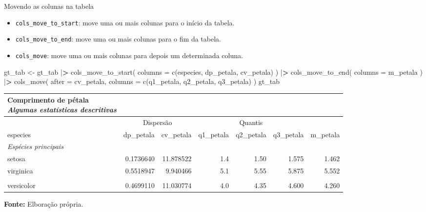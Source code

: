 \documentclass[
  10pt,
  ignorenonframetext,
]{beamer}
\newenvironment{Shaded}{}{}
\newcommand{\DataTypeTok}[1]{#1}
\newcommand{\ErrorTok}[1]{\textcolor[rgb]{1.00,0.00,0.00}{\textbf{#1}}}
\newcommand{\KeywordTok}[1]{\textcolor[rgb]{0.00,0.00,1.00}{#1}}
\newcommand{\NormalTok}[1]{#1}
\newcommand{\OperatorTok}[1]{#1}
\newcommand{\StringTok}[1]{\textcolor[rgb]{0.00,0.50,0.50}{#1}}
\providecommand{\tightlist}{%
  \setlength{\itemsep}{0pt}\setlength{\parskip}{0pt}}
\begin{document}
\begin{frame}[fragile]{Movendo as colunas na tabela}
\protect\hypertarget{movendo-as-colunas-na-tabela}{}
\begin{itemize}
\tightlist
\item
  \texttt{cols\_move\_to\_start}: move uma ou mais colunas para o início
  da tabela.
\item
  \texttt{cols\_move\_to\_end}: move uma ou mais colunas para o fim da
  tabela.
\item
  \texttt{cols\_move}: move uma ou mais colunas para depois um
  determinada coluna.
\end{itemize}

\begin{Shaded}
\begin{Highlighting}[]
\NormalTok{gt\_tab \textless{}{-}}\StringTok{ }\NormalTok{gt\_tab }\OperatorTok{|}\ErrorTok{\textgreater{}}
\StringTok{  }\KeywordTok{cols\_move\_to\_start}\NormalTok{(}
    \DataTypeTok{columns =} \KeywordTok{c}\NormalTok{(especies, dp\_petala, cv\_petala)}
\NormalTok{  ) }\OperatorTok{|}\ErrorTok{\textgreater{}}
\StringTok{  }\KeywordTok{cols\_move\_to\_end}\NormalTok{(}
    \DataTypeTok{columns =}\NormalTok{ m\_petala}
\NormalTok{  ) }\OperatorTok{|}\ErrorTok{\textgreater{}}
\StringTok{  }\KeywordTok{cols\_move}\NormalTok{(}
    \DataTypeTok{after =}\NormalTok{ cv\_petala,}
    \DataTypeTok{columns =} \KeywordTok{c}\NormalTok{(q1\_petala, q2\_petala, q3\_petala)}
\NormalTok{  )}
\NormalTok{gt\_tab}
\end{Highlighting}
\end{Shaded}
\end{frame}

\begin{frame}
\footnotesize

\setlength{\LTpost}{0mm}
\begin{longtable}{lrrrrrr}
\caption*{
{\large \textbf{Comprimento de pétala}} \\ 
{\small \emph{Algumas estatísticas descritivas}}
} \\ 
\toprule
 & \multicolumn{2}{c}{Dispersão} & \multicolumn{3}{c}{Quantis} &  \\ 
\cmidrule(lr){2-3} \cmidrule(lr){4-6}
especies & dp\_petala & cv\_petala & q1\_petala & q2\_petala & q3\_petala & m\_petala \\ 
\midrule
\multicolumn{7}{l}{\emph{Espécies principais}} \\ 
\midrule
setosa & 0.1736640 & 11.878522 & 1.4 & 1.50 & 1.575 & 1.462 \\ 
virginica & 0.5518947 & 9.940466 & 5.1 & 5.55 & 5.875 & 5.552 \\ 
\midrule
\multicolumn{7}{l}{\vspace*{-5mm}} \\ 
versicolor & 0.4699110 & 11.030774 & 4.0 & 4.35 & 4.600 & 4.260 \\ 
\bottomrule
\end{longtable}
\begin{minipage}{\linewidth}
\textbf{Fonte:} Elboração própria.\\
\end{minipage}

\normalsize
\end{frame}
\end{document}
